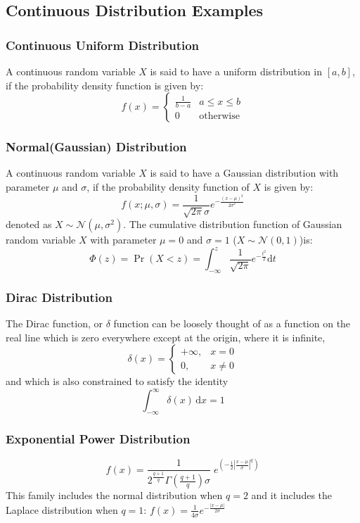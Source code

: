 \documentclass[11pt]{article}
\def\MN{{\mathcal N}}
\begin{document}
\subsection{Continuous Distribution Examples}
\subsubsection{Continuous Uniform Distribution}
A continuous random variable $X$ is said to have a uniform distribution in $[a,b]$, 
if the probability density function is given by:
\[ f(x)=\begin{cases}
  \frac{1}{b - a} &  a \leq x \leq b \\
  0 & \mbox{otherwise}
  \end{cases} \]

\subsubsection{Normal(Gaussian) Distribution}
A continuous random variable $X$ is said to have a Gaussian distribution with parameter $\mu$ and $\sigma$, if the probability density function of $X$ is given by:
\[f(x; \mu, \sigma) = \frac{1}{\sqrt{2\pi}\sigma} e^{-\frac{(x-\mu)^2}{2\sigma^2}}\]
denoted as $X\sim \MN(\mu, \sigma^2)$. The cumulative distribution function of Gaussian random variable $X$ with parameter $\mu = 0$ and $\sigma = 1$ ($X\sim \MN(0,1)$)is:
\[\Phi(z) = \Pr(X < z) = \int_{-\infty}^z \frac{1}{\sqrt{2\pi}} e^{-\frac{t^2}{2}} \mathrm dt\]

\subsubsection{Dirac Distribution}
The Dirac function, or $\delta$ function can be loosely thought of as a function on the real line which is zero everywhere except at the origin, where it is infinite,
$$\delta(x) = \begin{cases} +\infty, & x = 0 \\ 0, & x \ne 0 \end{cases}$$
and which is also constrained to satisfy the identity
$$\int_{-\infty}^\infty \delta(x) \, \mathrm dx = 1$$
\subsubsection{Exponential Power Distribution}
$$
f(x)=\frac{1}{2^{\frac{q+1}{q}}\Gamma(\frac{q+1}{q})\sigma} \; e^{\left(-\frac{1}{2}|\frac{x-\mu}{\sigma}|^q\right)}
$$
This family includes the normal distribution when $q=2$ and it includes the Laplace distribution when $q=1$: $f(x)=\frac{1}{4\sigma} e^{-\frac{|x-\mu|}{2\sigma}}$
\end{document}
